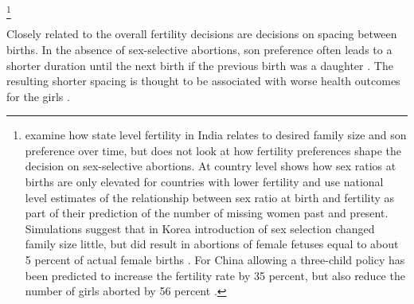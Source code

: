 \documentclass[12pt,letterpaper]{article}
\begin{document}
\footnote{
\citet{Dharmalingam2014} examine how state level fertility in India
relates to desired family size and son preference over time, but does 
not look at how fertility preferences shape the decision on sex-selective 
abortions.
At country level \citet{Bongaarts2013} shows how sex ratios at births are 
only elevated for countries with lower fertility and
\citet{Bongaarts2015} use national level estimates of the relationship
between sex ratio at birth and fertility as part of their
prediction of the number of missing women past and present.
Simulations suggest that in Korea introduction of sex selection
changed family size little, but did result in abortions
of female fetuses equal to about 5 percent of actual female
births \citep{park95}.
For China allowing a three-child policy has been predicted to 
increase the fertility rate by 35 percent, but also reduce the
number of girls aborted by 56 percent \citep{Ebenstein2011}.
}







Closely related to the overall fertility decisions are decisions on  spacing between births.
In the absence of sex-selective abortions, son preference often leads to a shorter duration 
until the next birth if the previous birth was a daughter  
\citep[see, for example,][]{Das1987,Rahman1993,Pong1994,Haughton1996,Arnold1997}.
The resulting shorter spacing is thought to be associated with worse health outcomes for
the girls \citep{arnold98,Whitworth2002,Rutstein2005,Conde-Agudelo2006}.
\end{document}
